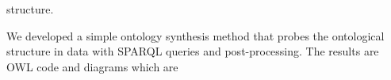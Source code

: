 																																																																																																																																																																																																																																																																																																																																																																																																																																																																																																																																																			structure. 

																																																																																																																																																																																																																																																																																																																																																																																																																																																																																																																																																			We developed a simple ontology synthesis method that probes
																																																																																																																																																																																																																																																																																																																																																																																																																																																																																																																																																			the ontological structure in data with
																																																																																																																																																																																																																																																																																																																																																																																																																																																																																																																																																			SPARQL queries and post-processing.
																																																																																																																																																																																																																																																																																																																																																																																																																																																																																																																																																			The results are OWL code and diagrams which are 
